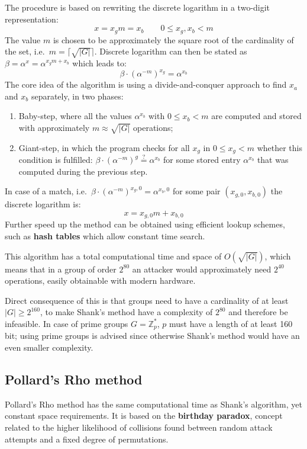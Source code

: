 The procedure is based on rewriting the discrete logarithm in a two-digit representation:
$$x = x_gm = x_b \qquad 0 \leq x_g, x_b < m$$
The value $m$ is chosen to be approximately the square root of the cardinality of the set, i.e.\ $m = \lceil{\sqrt{|G|}}\rceil$. Discrete logarithm can then be stated as $\beta = \alpha^x = \alpha^{x_gm + x_b}$ which leads to:
$$\beta \cdot (\alpha^{-m})^{x_g} = \alpha^{x_b}$$ 
The core idea of the algorithm is using a divide-and-conquer approach to find $x_a$ and $x_b$ separately, in two phases:
\begin{enumerate}
	\item Baby-step, where all the values $\alpha^{x_b}$ with $0 \leq x_b < m$ are computed and stored with approximately $m \approx \sqrt{|G|}$ operations;
	\item Giant-step, in which the program checks for all $x_g$ in $0 \leq x_g < m$ whether this condition is fulfilled: 
	$\beta \cdot (\alpha^{-m})^g \stackrel{?}{=} \alpha^{x_b}$ for some stored entry $\alpha^{x_b}$ that was computed during the previous step.
\end{enumerate}
In case of a match, i.e.\ $\beta \cdot (\alpha^{-m})^{x_g, 0} = \alpha^{x_b, 0}$ for some pair $(x_{g, 0}, x_{b, 0})$ the discrete logarithm is:
$$x = x_{g, 0}m + x_{b, 0}$$
Further speed up the method can be obtained using efficient lookup schemes, such as \textbf{hash tables} which allow constant time search.

This algorithm has a total computational time and space of $O(\sqrt{|G|})$, which means that in a group of order $2^{80}$ an attacker would approximately need $2^{40}$ operations, easily obtainable with modern hardware.

Direct consequence of this is that groups need to have a cardinality of at least $|G| \geq 2^{160}$, to make Shank's method have a complexity of $2^{80}$ and therefore be infeasible. In case of prime groups $G = \mathbb{Z}^*_p$, $p$ must have a length of at least 160 bit; using prime groups is advised since otherwise Shank's method would have an even smaller complexity. 

\subsection{Pollard's Rho method}
Pollard's Rho method has the same computational time as Shank's algorithm, yet constant space requirements. It is based on the \textbf{birthday paradox}, concept related to the higher likelihood of collisions found between random attack attempts and a fixed degree of permutations.

